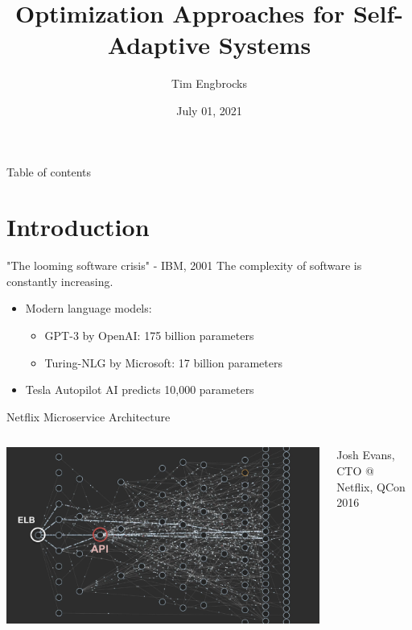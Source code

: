 \documentclass[en,16:9]{sdqbeamer}
\title[Optimization Approaches for Self-Adaptive Systems]{Optimization Approaches for Self-Adaptive Systems}
\author[Tim Engbrocks]{Tim Engbrocks}
\date[01.\,07.\,2021]{July 01, 2021}
\begin{document}
\KITtitleframe

\begin{frame}{Table of contents}
\tableofcontents
\end{frame}

\section{Introduction}

\begin{frame}{"The looming software crisis" - IBM, 2001}
	The complexity of software is constantly increasing.
	\medskip
	\begin{itemize}
		\item Modern language models: 
		\begin{itemize}
			\item GPT-3 by OpenAI: 175 billion parameters \cite*{GPT3}
			\item Turing-NLG by Microsoft: 17 billion parameters \cite*{TuringNLG}
		\end{itemize}
		\item Tesla Autopilot AI predicts 10,000 parameters \cite*{TeslaAutopilot}
	\end{itemize}
\end{frame}

\begin{frame}{Netflix Microservice Architecture}
	\begin{columns}
		 \begin{center}
			\includegraphics[width=\textwidth]{sources/Mastering Chaos.pdf}
		\end{center}
		 Josh Evans, CTO @ Netflix, QCon 2016 \cite*{JoshQCon}
	\end{columns}
\end{frame}
\end{document}
